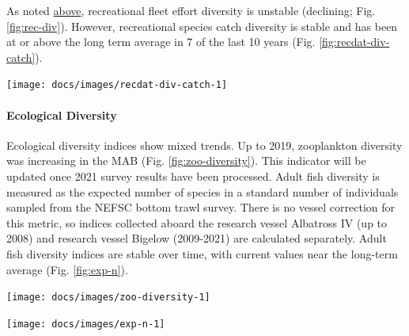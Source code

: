 \documentclass[
  10pt,
]{article}
\let\origfigure\figure
\let\endorigfigure\endfigure
\renewenvironment{figure}[1][2] {
    \expandafter\origfigure\expandafter[H]
} {
    \endorigfigure
}
\begin{document}
As noted \protect\hyperlink{recreational-opportunities}{above},
recreational fleet effort diversity is unstable (declining; Fig.
\ref{fig:rec-div}). However, recreational species catch diversity is
stable and has been at or above the long term average in 7 of the last
10 years (Fig. \ref{fig:recdat-div-catch}).

\begin{figure}

{\centering \texttt{[image: docs/images/recdat-div-catch-1]} 

}

\caption{Diversity of recreational catch in the Mid-Atlantic.}\label{fig:recdat-div-catch}
\end{figure}

\hypertarget{ecological-diversity}{%
\paragraph{Ecological Diversity}\label{ecological-diversity}}

Ecological diversity indices show mixed trends. Up to 2019, zooplankton
diversity was increasing in the MAB (Fig. \ref{fig:zoo-diversity}). This
indicator will be updated once 2021 survey results have been processed.
Adult fish diversity is measured as the expected number of species in a
standard number of individuals sampled from the NEFSC bottom trawl
survey. There is no vessel correction for this metric, so indices
collected aboard the research vessel Albatross IV (up to 2008) and
research vessel Bigelow (2009-2021) are calculated separately. Adult
fish diversity indices are stable over time, with current values near
the long-term average (Fig. \ref{fig:exp-n}).

\begin{figure}

{\centering \texttt{[image: docs/images/zoo-diversity-1]} 

}

\caption{Zooplankton diversity in the Mid-Atlantic Bight up to 2019, based on Shannon diversity index.}\label{fig:zoo-diversity}
\end{figure}

\begin{figure}

{\centering \texttt{[image: docs/images/exp-n-1]} 

}

\caption{Adult fish diversity the Mid-Atlantic Bight, based on expected number of species.}\label{fig:exp-n}
\end{figure}
\end{document}
